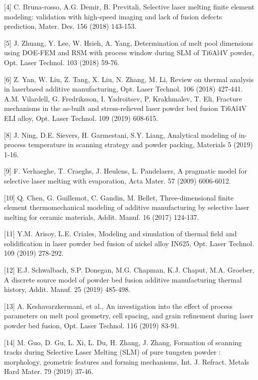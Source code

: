 \documentclass[10pt]{article}
\begin{document}
[4] C. Bruna-rosso, A.G. Demir, B. Previtali, Selective laser melting finite element modeling: validation with high-speed imaging and lack of fusion defects prediction, Mater. Des. 156 (2018) 143-153.

[5] J. Zhuang, Y. Lee, W. Hsieh, A. Yang, Determination of melt pool dimensions using DOE-FEM and RSM with process window during SLM of Ti6Al4V powder, Opt. Laser Technol. 103 (2018) 59-76.

[6] Z. Yan, W. Liu, Z. Tang, X. Liu, N. Zhang, M. Li, Review on thermal analysis in laserbased additive manufacturing, Opt. Laser Technol. 106 (2018) 427-441.\\
[7] A.M. Vilardell, G. Fredriksson, I. Yadroitsev, P. Krakhmalev, T. Eli, Fracture mechanisms in the as-built and stress-relieved laser powder bed fusion Ti6Al4V ELI alloy, Opt. Laser Technol. 109 (2019) 608-615.

[8] J. Ning, D.E. Sievers, H. Garmestani, S.Y. Liang, Analytical modeling of in-process temperature in scanning strategy and powder packing, Materials 5 (2019) 1-16.

[9] F. Verhaeghe, T. Craeghs, J. Heulens, L. Pandelaers, A pragmatic model for selective laser melting with evaporation, Acta Mater. 57 (2009) 6006-6012.

[10] Q. Chen, G. Guillemot, C. Gandin, M. Bellet, Three-dimensional finite element thermomechanical modeling of additive manufacturing by selective laser melting for ceramic materials, Addit. Manuf. 16 (2017) 124-137.

[11] Y.M. Arisoy, L.E. Criales, Modeling and simulation of thermal field and solidification in laser powder bed fusion of nickel alloy IN625, Opt. Laser Technol. 109 (2019) 278-292.

[12] E.J. Schwalbach, S.P. Donegan, M.G. Chapman, K.J. Chaput, M.A. Groeber, A discrete source model of powder bed fusion additive manufacturing thermal history, Addit. Manuf. 25 (2019) 485-498.

[13] A. Keshavarzkermani, et al., An investigation into the effect of process parameters on melt pool geometry, cell spacing, and grain refinement during laser powder bed fusion, Opt. Laser Technol. 116 (2019) 83-91.

[14] M. Guo, D. Gu, L. Xi, L. Du, H. Zhang, J. Zhang, Formation of scanning tracks during Selective Laser Melting (SLM) of pure tungsten powder : morphology, geometric features and forming mechanisms, Int. J. Refract. Metals Hard Mater. 79 (2019) 37-46.
\end{document}
